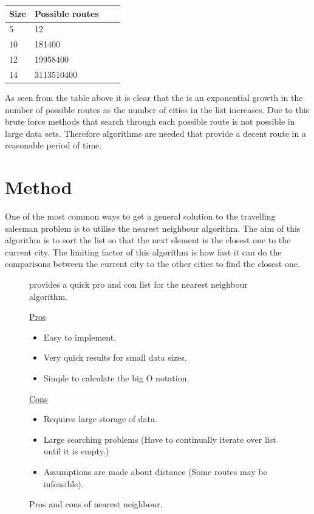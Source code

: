 \documentclass[conference,backref=page]{acmsiggraph}
\begin{document}
\begin{center}
	\begin{tabular}{| l | l | l | l |}
		\hline
		Size& Possible routes\\ \hline
		5 & 12 \\ \hline
		10 & 181400 \\ \hline
		12 & 19958400 \\ \hline
		14 & 3113510400 \\ \hline
	\end{tabular}
\end{center}

As seen from the table above it is clear that the is an exponential growth in the number of possible routes as the number of cities in the list increases. Due to this brute force methods that search through each possible route is not possible in large data sets. Therefore algorithms are needed that provide a decent route in a reasonable period of time. 

\section{Method}

One of the most common ways to get a general solution to the travelling salesman problem is to utilise the nearest neighbour algorithm. The aim of this algorithm is to sort the list so that the next element is the closest one to the current city. The limiting factor of this algorithm is how fast it can do the comparisons between the current city to the other cities to find the closest one.

\begin{figure}[h]
	
\cite{nn} provides a quick pro and con list for the nearest neighbour algorithm.\\
\begin{center}
\underline{Pros}
\end{center}
\begin{itemize}
	\item Easy to implement.
	\item Very quick results for small data sizes.
	\item Simple to calculate the big O notation.
	
\end{itemize}
\begin{center}
\underline{Cons}
\end{center}
\begin{itemize}
	\item Requires large storage of data. 
	\item Large searching problems (Have to continually iterate over list until it is empty.)
	\item Assumptions are made about distance (Some routes may be infeasible).
\end{itemize}
\caption{Pros and cons of nearest neighbour.}
\end{figure}
\end{document}

